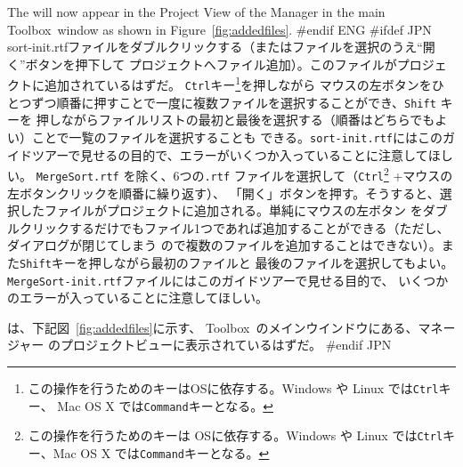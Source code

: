 \documentclass[\pformat,12pt]{article}
\newcommand{\Toolbox}{Toolbox}
\newcommand{\Toolbox}{Toolbox}
\newcommand{\cmd}{\tt }
\newcommand{\guicmd}[1]{{\sf #1}}
\newcommand{\guicmd}[1]{{\gt #1}}
\begin{document}
The 
  will now appear in the \guicmd{Project View}
  of the \guicmd{Manager} in the main \Toolbox\ window as
  shown in Figure~\ref{fig:addedfiles}.
#endif ENG
#ifdef JPN
{%
sort-init.rtfファイルをダブルクリックする（またはファイルを選択のうえ``\guicmd{開く}''ボタンを押下して
プロジェクトへファイル追加）。このファイルがプロジェクトに追加されているはずだ。
{\cmd Ctrl}キー\footnote{この操作を行うためのキーはOSに依存する。Windows や Linux では{\cmd Ctrl}キー、
Mac OS X では{\cmd Command}キーとなる。}を押しながら
マウスの左ボタンをひとつずつ順番に押すことで一度に複数ファイルを選択することができ、{\cmd Shift} キーを
押しながらファイルリストの最初と最後を選択する（順番はどちらでもよい）ことで一覧のファイルを選択することも
できる。{\tt sort-init.rtf}にはこのガイドツアーで見せるの目的で、エラーがいくつか入っていることに注意してほしい。
}
{%
{\tt MergeSort.rtf} を除く、6つの{\tt .rtf} ファイルを選択して（{\cmd Ctrl}\footnote{この操作を行うためのキーは
OSに依存する。Windows や Linux では{\cmd Ctrl}キー、Mac OS X では{\cmd Command}キーとなる。}
 +マウスの左ボタンクリックを順番に繰り返す）、
「開く」ボタンを押す。そうすると、選択したファイルがプロジェクトに追加される。単純にマウスの左ボタン
をダブルクリックするだけでもファイル1つであれば追加することができる（ただし、ダイアログが閉じてしまう
ので複数のファイルを追加することはできない）。また{\cmd Shift}キーを押しながら最初のファイルと
最後のファイルを選択してもよい。{\tt MergeSort-init.rtf}ファイルにはこのガイドツアーで見せる目的で、
いくつかのエラーが入っていることに注意してほしい。
}

は、下記図~\ref{fig:addedfiles}に示す、
\Toolbox\ のメインウインドウにある、\guicmd{マネージャー} の\guicmd{プロジェクトビュー}に表示されているはずだ。
#endif JPN
\end{document}
